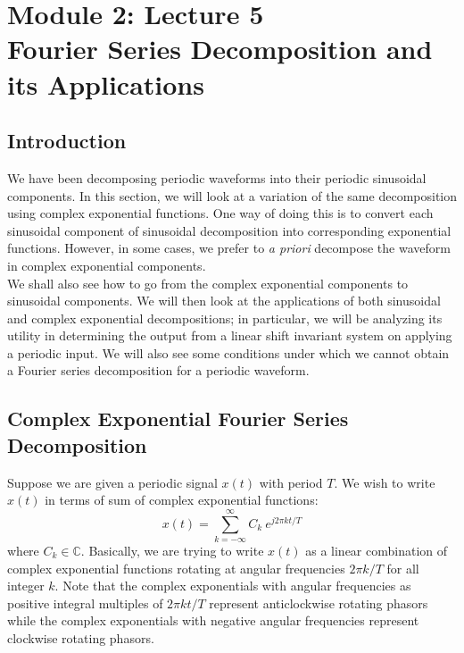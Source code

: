 \section{Module 2: Lecture 5\\Fourier Series Decomposition and its Applications}

\subsection{Introduction}
We have been decomposing periodic waveforms into their periodic sinusoidal components. In this section, we will look at a variation of the same decomposition using complex exponential functions. One way of doing this is to convert each sinusoidal component of sinusoidal decomposition into corresponding exponential functions. However, in some cases, we prefer to \textit{a priori} decompose the waveform in complex exponential components.\\
We shall also see how to go from the complex exponential components to sinusoidal components. We will then look at the applications of both sinusoidal and complex exponential decompositions; in particular, we will be analyzing its utility in determining the output from a linear shift invariant system on applying a periodic input.
We will also see some conditions under which we cannot obtain a Fourier series decomposition for a periodic waveform.
\subsection{Complex Exponential Fourier Series Decomposition}
Suppose we are given a periodic signal $x(t)$ with period $T$. We wish to write $x(t)$ in terms of sum of complex exponential functions:
$$ x(t) = \sum_{k=-\infty}^{\infty}{C_{k} \ e^{j2\pi kt/T}} $$
where $C_k \in \mathbb{C}$.
Basically, we are trying to write $x(t)$ as a linear combination of complex exponential functions rotating at angular frequencies $2\pi k/T$ for all integer $k$. Note that the complex exponentials with angular frequencies as positive integral multiples of $2\pi kt/T$ represent anticlockwise rotating phasors while the complex exponentials with negative angular frequencies represent clockwise rotating phasors.

